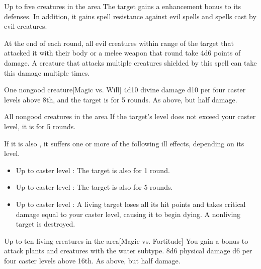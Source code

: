 \spelldur{\durshort \dismissable}
\begin{spelltargets}{Up to five creatures in the area}
    The target gains a  enhancement bonus to its defenses. In addition, it gains spell resistance against evil spells and spells cast by evil creatures.
    \par At the end of each round, all evil creatures within \rngclose range of the target that attacked it with their body or a melee weapon that round take 4d6 points of damage. A creature that attacks multiple creatures shielded by this spell can take this damage multiple times.
\end{spelltargets}

\spellrng{\rngmed}
\begin{spelltarget}{One nongood creature}[Magic vs. Will]
    \spellsuccess 4d10 divine damage \add d10 per four caster levels above 8th, and the target is \bewildered for 5 rounds.
    \spellfailure As above, but half damage.
\end{spelltarget}

\begin{spelltargets}{All nongood creatures in the area}
    \spelleffect If the target's level does not exceed your caster level, it is \deafened for 5 rounds.

    If it is also \bloodied, it suffers one or more of the following ill effects, depending on its level.
    \begin{itemize}
        \item Up to caster level : The target is also \blinded for 1 round.
        \item Up to caster level : The target is also \paralyzed for 5 rounds.
        \item Up to caster level : A living target loses all its hit points and takes critical damage equal to your caster level, causing it to begin dying. A nonliving target is destroyed.
    \end{itemize}
\end{spelltargets}

\begin{spelltargets}{Up to ten living creatures in the area}[Magic vs. Fortitude]
    \spellspecial You gain a  bonus to attack plants and creatures with the water subtype.
    \spellsuccess 8d6 physical damage \add d6 per four caster levels above 16th.
    \spellfailure As above, but half damage.
\end{spelltargets}

